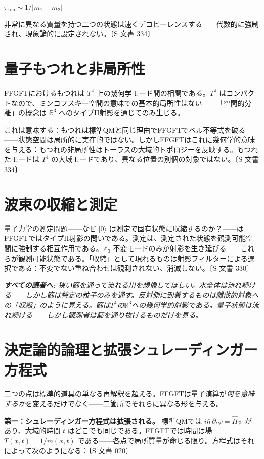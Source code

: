 \documentclass[11pt,openany]{book}
\newenvironment{laierspur}{%
  \par\vspace{4pt}%
  \noindent\small\itshape\color{blue!60!black}%
  \textbf{すべての読者へ:}\enspace\ignorespaces}{%
  \par\vspace{4pt}\normalsize\normalfont\normalcolor}
\begin{document}
$\tau_\text{koh} \sim 1/|m_1 - m_2|$

非常に異なる質量を持つ二つの状態は速くデコヒーレンスする——代数的に強制され、現象論的に設定されない。〔S 文書 334〕

\section*{量子もつれと非局所性}

FFGFTにおけるもつれは $T^4$ 上の幾何学モード間の相関である。$T^4$ はコンパクトなので、ミンコフスキー空間の意味での基本的局所性はない——「空間的分離」の概念は $\mathbb{R}^3$ へのタイプII射影を通じてのみ生じる。

これは意味する：もつれは標準QMと同じ理由でFFGFTでベル不等式を破る——状態空間は局所的に実在的ではない。しかしFFGFTはこれに幾何学的意味を与える：もつれの非局所性はトーラスの大域的トポロジーを反映する。もつれたモードは $T^4$ の大域モードであり、異なる位置の別個の対象ではない。〔S 文書 334〕

\section*{波束の収縮と測定}

量子力学の測定問題——なぜ $|0\rangle$ は測定で固有状態に収縮するのか？——はFFGFTではタイプII射影の問いである。測定は、測定された状態を観測可能空間に強制する相互作用である。$\mathbb{Z}_3$-不変モードのみが射影を生き延びる——これらが観測可能状態である。「収縮」として現れるものは射影フィルターによる選択である：不変でない重ね合わせは観測されない、消滅しない。〔S 文書 330〕

\begin{laierspur}
狭い篩を通って流れる川を想像してほしい。水全体は流れ続ける——しかし篩は特定の粒子のみを通す。反対側に到着するものは離散的対象への「収縮」のように見える。篩は$T^4$の$\mathbb{R}^3$への幾何学的射影である。量子状態は流れ続ける——しかし観測者は篩を通り抜けるものだけを見る。
\end{laierspur}

\section*{決定論的論理と拡張シュレーディンガー方程式}

二つの点は標準的道具の単なる再解釈を超える。FFGFTは量子演算が\textit{何を意味するか}を変えるだけでなく——二箇所でそれらに異なる形を与える。

\textbf{第一：シュレーディンガー方程式は拡張される。}
標準QMでは $i\hbar\,\partial_t\psi = \hat{H}\psi$ があり、大域的時間 $t$ はどこでも同じである。FFGFTでは時間は場 $T(x,t) = 1/m(x,t)$ である——各点で局所質量が命じる限り。方程式はそれによって次のようになる：〔S 文書 020〕
\end{document}
